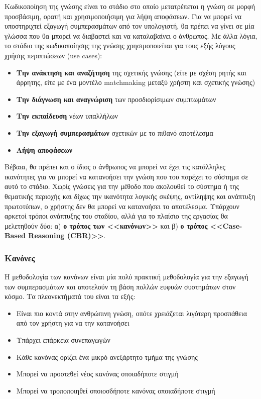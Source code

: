 Κωδικοποίηση της γνώσης είναι το στάδιο στο οποίο μετατρέπεται η γνώση σε μορφή προσβάσιμη, ορατή και χρησιμοποιήσιμη για λήψη αποφάσεων. Για να μπορεί να υποστηριχτεί εξαγωγή συμπερασμάτων από τον υπολογιστή, θα πρέπει να γίνει σε μία γλώσσα που θα μπορεί να διαβαστεί και να καταλαβαίνει ο άνθρωπος. Με άλλα λόγια, το στάδιο της κωδικοποίησης της γνώσης χρησιμοποιείται για τους εξής λόγους χρήσης περιπτώσεων (use cases):

\begin{itemize}
  \item \textbf{Την ανάκτηση και αναζήτηση} της σχετικής γνώσης (είτε με σχέση ρητής και άρρητης, είτε με ένα μοντέλο matchmaking μεταξύ χρήστη και σχετικής γνώσης)
  \item \textbf{Την διάγνωση και αναγνώριση} των προσδιορίσιμων συμπτωμάτων
  \item \textbf{Την εκπαίδευση} νέων υπαλλήλων
  \item \textbf{Την εξαγωγή συμπερασμάτων} σχετικών με το πιθανό αποτέλεσμα
  \item \textbf{Λήψη αποφάσεων}
\end{itemize}

Βέβαια, θα πρέπει και ο ίδιος ο άνθρωπος να μπορεί να έχει τις κατάλληλες ικανότητες για να μπορεί να κατανοήσει την γνώση που του παρέχει το σύστημα σε αυτό το στάδιο. Χωρίς γνώσεις για την μέθοδο που ακολουθεί το σύστημα ή της θεματικής περιοχής και δίχως την ικανότητα λογικής σκέψης, αντίληψης και ανάπτυξη πρωτοτύπων, ο χρήστης δεν θα μπορεί να κατανοήσει το αποτέλεσμα. Υπάρχουν αρκετοί τρόποι ανάπτυξης του σταδίου, αλλά για το πλαίσιο της εργασίας θα μελετηθούν δύο: α) \textbf{ο τρόπος των <<κανόνων>>} και β) \textbf{ο τρόπος <<Case-Based Reasoning (CBR)>>}.

\subsubsection*{Κανόνες}

Η μεθοδολογία των κανόνων είναι μία πολύ πρακτική μεθοδολογία για την εξαγωγή των συμπερασμάτων και αποτελούν τη βάση πολλών ευφυών συστημάτων στον κόσμο. Τα πλεονεκτήματά του είναι τα εξής:

\begin{itemize}
  \item Είναι πιο κοντά στην ανθρώπινη γνώση, οπότε χρειάζεται λιγότερη προσπάθεια από τον χρήστη για να την κατανοήσει
  \item Υπάρχει επάρκεια συνεπαγωγών
  \item Κάθε κανόνας ορίζει ένα μικρό ανεξάρτητο τμήμα της γνώσης
  \item Μπορεί να προστεθεί νέος κανόνας οποιαδήποτε στιγμή
  \item Μπορεί να τροποποιηθεί οποιοσδήποτε κανόνας οποιαδήποτε στιγμή
\end{itemize}

